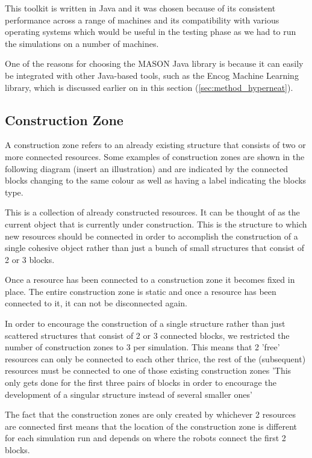 This toolkit is written in Java and it was chosen because of its consistent performance across a range of machines and its compatibility with various operating systems which would be useful in the testing phase as we had to run the simulations on a number of machines.

One of the reasons for choosing the MASON Java library is because it can easily be integrated with other Java-based tools, such as the Encog Machine Learning library, which is discussed earlier on in this section (\ref{sec:method_hyperneat}).

\subsection{Construction Zone}

A construction zone refers to an already existing structure that consists of two or more connected resources.
Some examples of construction zones are shown in the following diagram (insert an illustration) and are indicated by the connected blocks changing to the same colour as well as having a label indicating the blocks type.

This is a collection of already constructed resources. It can be thought of as the current object that is currently under construction. This is the structure to which new resources should be connected in order to accomplish the construction of a single cohesive object rather than just a bunch of small structures that consist of 2 or 3 blocks.

Once a resource has been connected to a construction zone it becomes fixed in place. The entire construction zone is static and once a resource has been connected to it, it can not be disconnected again.

In order to encourage the construction of a single structure rather than just scattered structures that consist of 2 or 3 connected blocks, we restricted the number of construction zones to 3 per simulation. This means that 2 'free' resources can only be connected to each other thrice, the rest of the (subsequent) resources must be connected to one of those existing construction zones 
'This only gets done for the first three pairs of blocks in order to encourage the development of a singular structure instead of several smaller ones'

The fact that the construction zones are only created by whichever 2 resources are connected first means that the location of the construction zone is different for each simulation run and depends on where the robots connect the first 2 blocks.

